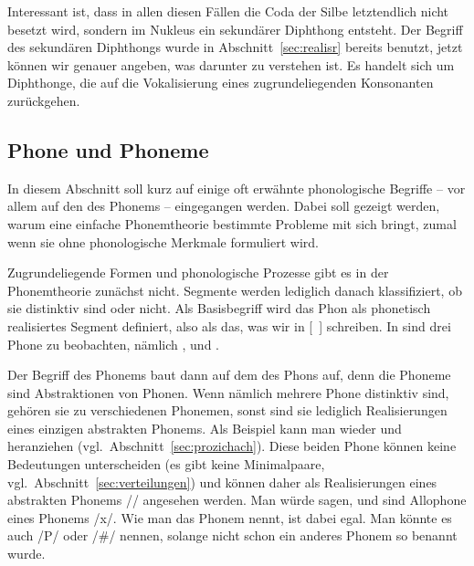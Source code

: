
Interessant ist, dass in allen diesen Fällen die Coda der Silbe letztendlich nicht besetzt wird, sondern im Nukleus ein sekundärer Diphthong entsteht.
Der Begriff des sekundären Diphthongs wurde in Abschnitt~\ref{sec:realisr} bereits benutzt, jetzt können wir genauer angeben, was darunter zu verstehen ist.
Es handelt sich um Diphthonge, die auf die Vokalisierung eines zugrundeliegenden Konsonanten zurückgehen.

\subsection[Phone und Phoneme]{\Opsional Phone und Phoneme}

\label{sec:phonphonem}

In diesem Abschnitt soll kurz auf einige oft erwähnte phonologische Begriffe -- vor allem auf den des Phonems -- eingegangen werden.
Dabei soll gezeigt werden, warum eine einfache Phonemtheorie bestimmte Probleme mit sich bringt, zumal wenn sie ohne phonologische Merkmale formuliert wird.

Zugrundeliegende Formen und phonologische Prozesse gibt es in der Phonemtheorie zunächst nicht.
Segmente werden lediglich danach klassifiziert, ob sie distinktiv sind oder nicht.
Als Basisbegriff wird das Phon als phonetisch realisiertes Segment definiert, also als das, was wir in [~] schreiben.
In \textipa{[ta:k]} sind drei Phone zu beobachten, nämlich \textipa{[t]}, \textipa{[a:]} und \textipa{[k]}.


Der Begriff des Phonems baut dann auf dem des Phons auf, denn die Phoneme sind Abstraktionen von Phonen.
Wenn nämlich mehrere Phone distinktiv sind, gehören sie zu verschiedenen Phonemen, sonst sind sie lediglich Realisierungen eines einzigen abstrakten Phonems.
Als Beispiel kann man wieder \textipa{[\c{c}]} und \textipa{[X]} heranziehen (vgl.\ Abschnitt~\ref{sec:prozichach}).
Diese beiden Phone können keine Bedeutungen unterscheiden (es gibt keine Minimalpaare, vgl.\ Abschnitt~\ref{sec:verteilungen}) und können daher als Realisierungen eines abstrakten Phonems // angesehen werden.
Man würde sagen, \textipa{[\c{c}]} und \textipa{[X]} sind Allophone eines Phonems /x/.
Wie man das Phonem nennt, ist dabei egal.
Man könnte es auch /P/ oder /\#/ nennen, solange nicht schon ein anderes Phonem so benannt wurde.

